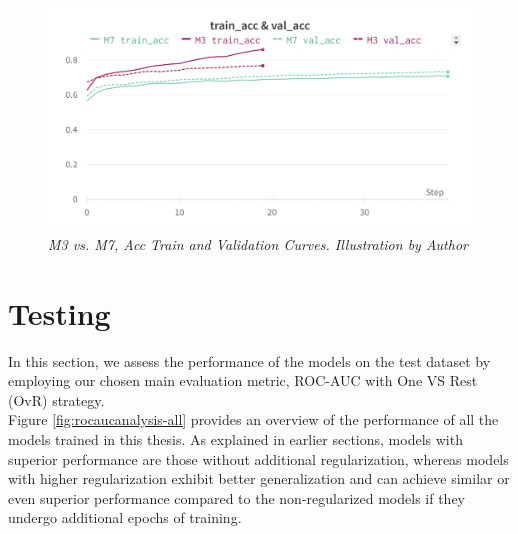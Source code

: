 \newpage

\begin{figure}[H]
  \centering
  \includegraphics[width=\textwidth]{imatges/results/AccM3M7.png}
  \caption[M3 vs. M7, Acc Train and Validation Curves]{\textit{M3 vs. M7, Acc Train and Validation Curves. Illustration by Author}}
\end{figure}


\newpage

\section{Testing}

In this section, we assess the performance of the models on the test dataset by
employing our chosen main evaluation metric, ROC-AUC with One VS Rest (OvR)
strategy. \\

Figure \ref{fig:rocaucanalysis-all} provides an overview of the
performance of all the models trained in this thesis. As explained in earlier
sections, models with superior performance are those without additional
regularization, whereas models with higher regularization exhibit better
generalization and can achieve similar or even superior performance compared to
the non-regularized models if they undergo additional epochs of training.

